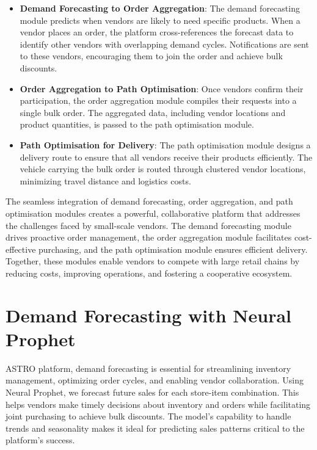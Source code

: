 \begin{itemize}
    \item \textbf{Demand Forecasting to Order Aggregation}: The demand forecasting module predicts when vendors are likely to need specific products. When a vendor places an order, the platform cross-references the forecast data to identify other vendors with overlapping demand cycles. Notifications are sent to these vendors, encouraging them to join the order and achieve bulk discounts.
    \item \textbf{Order Aggregation to Path Optimisation}: Once vendors confirm their participation, the order aggregation module compiles their requests into a single bulk order. The aggregated data, including vendor locations and product quantities, is passed to the path optimisation module.
    \item \textbf{Path Optimisation for Delivery}: The path optimisation module designs a delivery route to ensure that all vendors receive their products efficiently. The vehicle carrying the bulk order is routed through clustered vendor locations, minimizing travel distance and logistics costs.
\end{itemize}



The seamless integration of demand forecasting, order aggregation, and path optimisation modules creates a powerful, collaborative platform that addresses the challenges faced by small-scale vendors. The demand forecasting module drives proactive order management, the order aggregation module facilitates cost-effective purchasing, and the path optimisation module ensures efficient delivery. Together, these modules enable vendors to compete with large retail chains by reducing costs, improving operations, and fostering a cooperative ecosystem.




\section{Demand Forecasting with Neural Prophet}

ASTRO platform, demand forecasting is essential for streamlining inventory management, optimizing order cycles, and enabling vendor collaboration. Using Neural Prophet, we forecast future sales for each store-item combination. This helps vendors make timely decisions about inventory and orders while facilitating joint purchasing to achieve bulk discounts. The model’s capability to handle trends and seasonality makes it ideal for predicting sales patterns critical to the platform’s success.

